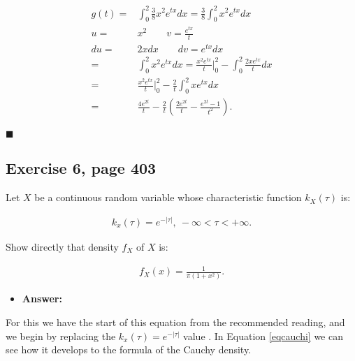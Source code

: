 \documentclass{article}
\begin{document}
\begin{eqnarray}
\label{eq7}
\begin{split}
g(t) = & \int_0^2 \frac{3}{8} x^2 e^{tx} dx = \frac{3}{8} \int_0^2 x^2 e^{tx}dx \\
u =& x^2 \qquad v = \frac{e^{tx}}{t}\\
du = & 2xdx \qquad dv = e^{tx}dx\\
= & \int_0^2 x^2e^{tx}dx = \frac{x^2 e^{tx}}{t} \Bigr \rvert_0^2- \int_0^2 \frac{2xe^{tx}}{t}dx\\
= & \frac{x^2e^{tx}}{t} \Bigr \rvert_0^2 - \frac{2}{t} \int_0^2 xe^{tx}dx\\
= & \frac{4e^{2t}}{t} - \frac{2}{t} \left( \frac{2e^{2t}}{t} - \frac{e^{2t}-1}{t^2}\right).
\end{split}
\end{eqnarray}

\begin{flushright}
$\blacksquare$
\end{flushright}

\subsection{Exercise 6, page 403}

Let $X$ be a continuous random variable whose characteristic function $k_X (\tau) $ is:

 \begin{eqnarray*}
\label{equation1}
k_x(\tau) = e^{-\lvert\tau\rvert}, \: -\infty < \tau < +\infty.
\end{eqnarray*}

Show directly that density $f_X$ of $X$ is:

 \begin{eqnarray*}
\label{equation2}
f_X(x) = \frac{1}{\pi (1+x^2)}.
\end{eqnarray*}


\begin{itemize}
\item \textbf{Answer:}
\end{itemize}

For this we have the start of this equation from the recommended reading, and we begin by replacing the $k_x(\tau) = e^{-\lvert\tau\rvert}$ value . In Equation \ref{eqcauchi} we can see how it develops to the formula of the Cauchy density.\\
\end{document}
